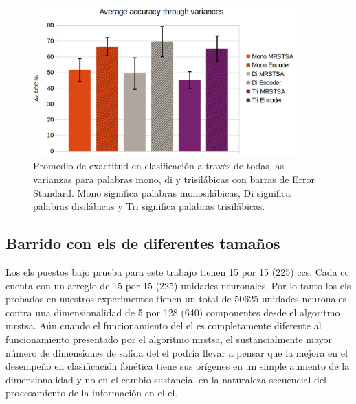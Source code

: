 \begin{figure}[h!]
    \centering
    \includegraphics[width=0.9\textwidth]{AV_ACC.png}
    \caption{Promedio de exactitud en clasificación a través de todas las varianzas para palabras mono, di y trisilábicas con barras de Error Standard. Mono significa palabras monosilábicas, Di significa palabras disilábicas y Tri significa palabras trisilábicas.}
    \label{fig:AV_ACC}
\end{figure}

\subsection{Barrido con \glspl{el} de diferentes tama\~nos}

Los \glspl{el} puestos bajo prueba para este trabajo tienen 15 por 15 (225) \glspl{cc}. Cada \gls{cc} cuenta con un arreglo de 15 por 15 (225) unidades neuronales. Por lo tanto los \glspl{el} probados en nuestros experimentos tienen un total de 50625 unidades neuronales contra una dimensionalidad de 5 por 128 (640) componentes desde el algoritmo \gls{mrstsa}. Aún cuando el funcionamiento del \gls{el} es completamente diferente al funcionamiento presentado por el algoritmo \gls{mrstsa}, el sustancialmente mayor número de dimensiones de salida del \gls{el} podría llevar a pensar que la mejora en el desempeño en clasificación fonética tiene sus orígenes en un simple aumento de la dimensionalidad y no en el cambio sustancial en la naturaleza secuencial del procesamiento de la información en el \gls{el}.

